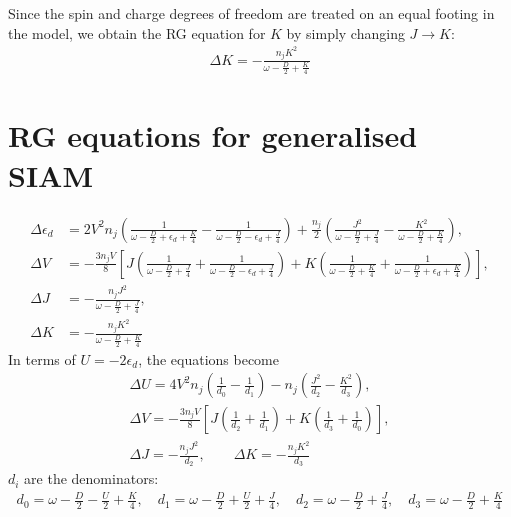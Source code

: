 Since the spin and charge degrees of freedom are treated on an equal footing in the model, we obtain the RG equation for \(K\) by simply changing \(J \to K\):
\begin{equation}\begin{aligned}
	\Delta K = -\frac{n_j K^2}{\omega - \frac{D}{2} + \frac{K}{4}}
\end{aligned}\end{equation}

\section{RG equations for generalised SIAM}
\begin{equation}\begin{aligned}
	\Delta \epsilon_d &= 2V^2 n_j\left(\frac{1}{\omega - \frac{D}{2} + \epsilon_d + \frac{K}{4}} - \frac{1}{\omega - \frac{D}{2} - \epsilon_d + \frac{J}{4}}\right) + \frac{n_j}{2}\left(\frac{J^2}{\omega - \frac{D}{2} + \frac{J}{4}} - \frac{K^2}{\omega - \frac{D}{2} + \frac{K}{4}}\right),\\
	\Delta V &= -\frac{3n_j V}{8}\left[J\left(\frac{1}{\omega - \frac{D}{2} + \frac{J}{4}} + \frac{1}{\omega - \frac{D}{2} - \epsilon_d + \frac{J}{4}}\right) + K \left(\frac{1}{\omega - \frac{D}{2} + \frac{K}{4}} + \frac{1}{\omega - \frac{D}{2} + \epsilon_d + \frac{K}{4}}\right)\right],\\
	\Delta J &= -\frac{n_j J^2}{\omega - \frac{D}{2} + \frac{J}{4}},\\ 
	\Delta K &= -\frac{n_j K^2}{\omega - \frac{D}{2} + \frac{K}{4}}
\end{aligned}\end{equation}
In terms of \(U = -2\epsilon_d\), the equations become
\begin{gather}
	\Delta U = 4V^2 n_j\left(\frac{1}{d_0} - \frac{1}{d_1}\right) - n_j\left(\frac{J^2}{d_2} - \frac{K^2}{d_3}\right),\\
	\Delta V = -\frac{3n_j V}{8}\left[J\left(\frac{1}{d_2} + \frac{1}{d_1}\right) + K \left(\frac{1}{d_3} + \frac{1}{d_0}\right)\right],\\
	\Delta J = -\frac{n_j J^2}{d_2}, \quad\quad\Delta K = -\frac{n_j K^2}{d_3}
\end{gather}
\(d_i\) are the denominators:
\begin{equation}\begin{aligned}
	\label{denominators}
	d_0 = \omega - \frac{D}{2} - \frac{U}{2} + \frac{K}{4}, \quad d_1 = \omega - \frac{D}{2} + \frac{U}{2} + \frac{J}{4}, \quad d_2 = \omega - \frac{D}{2} + \frac{J}{4}, \quad d_3 = \omega - \frac{D}{2} + \frac{K}{4}
\end{aligned}\end{equation}

